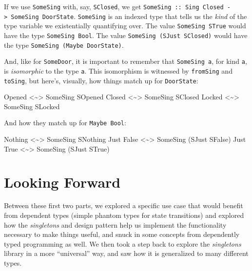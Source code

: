 \documentclass[]{article}
\newenvironment{Shaded}{}{}
\newcommand{\DataTypeTok}[1]{\textcolor[rgb]{0.56,0.13,0.00}{#1}}
\newcommand{\NormalTok}[1]{#1}
\newcommand{\OperatorTok}[1]{\textcolor[rgb]{0.40,0.40,0.40}{#1}}
\begin{document}
If we use \texttt{SomeSing} with, say, \texttt{SClosed}, we get
\texttt{SomeSing\ ::\ Sing\ \textquotesingle{}Closed\ -\textgreater{}\ SomeSing\ DoorState}.
\texttt{SomeSing} is an indexed type that tells us the \emph{kind} of the type
variable we existentially quantifying over. The value \texttt{SomeSing\ STrue}
would have the type \texttt{SomeSing\ Bool}. The value
\texttt{SomeSing\ (SJust\ SClosed)} would have the type
\texttt{SomeSing\ (Maybe\ DoorState)}.

And, like for \texttt{SomeDoor}, it is important to remember that
\texttt{SomeSing\ a}, for kind \texttt{a}, is \emph{isomorphic} to the type
\texttt{a}. This isomorphism is witnessed by \texttt{fromSing} and
\texttt{toSing}, but here's, visually, how things match up for
\texttt{DoorState}:

\begin{Shaded}
\begin{Highlighting}[]
\DataTypeTok{Opened}   \OperatorTok{<\textasciitilde{}>}    \DataTypeTok{SomeSing} \DataTypeTok{SOpened}
\DataTypeTok{Closed}   \OperatorTok{<\textasciitilde{}>}    \DataTypeTok{SomeSing} \DataTypeTok{SClosed}
\DataTypeTok{Locked}   \OperatorTok{<\textasciitilde{}>}    \DataTypeTok{SomeSing} \DataTypeTok{SLocked}
\end{Highlighting}
\end{Shaded}

And how they match up for \texttt{Maybe\ Bool}:

\begin{Shaded}
\begin{Highlighting}[]
\DataTypeTok{Nothing}      \OperatorTok{<\textasciitilde{}>}  \DataTypeTok{SomeSing} \DataTypeTok{SNothing}
\DataTypeTok{Just} \DataTypeTok{False}   \OperatorTok{<\textasciitilde{}>}  \DataTypeTok{SomeSing}\NormalTok{ (}\DataTypeTok{SJust} \DataTypeTok{SFalse}\NormalTok{)}
\DataTypeTok{Just} \DataTypeTok{True}    \OperatorTok{<\textasciitilde{}>}  \DataTypeTok{SomeSing}\NormalTok{ (}\DataTypeTok{SJust} \DataTypeTok{STrue}\NormalTok{)}
\end{Highlighting}
\end{Shaded}

\hypertarget{looking-forward}{%
\section{Looking Forward}\label{looking-forward}}

Between these first two parts, we explored a specific use case that would
benefit from dependent types (simple phantom types for state transitions) and
explored how the \emph{singletons} and design pattern help us implement the
functionality necessary to make things useful, and snuck in some concepts from
dependently typed programming as well. We then took a step back to explore the
\emph{singletons} library in a more ``universal'' way, and saw how it is
generalized to many different types.
\end{document}
